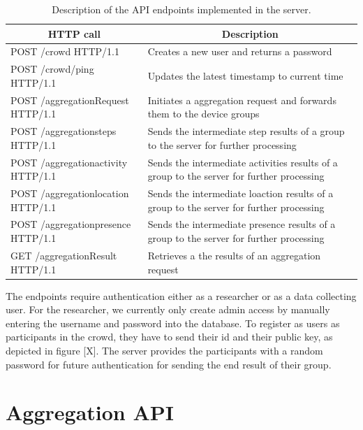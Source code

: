 \begin{table}[htbp]
\centering
  \begin{tabularx}{0.92\textwidth}{|l|X|}                                                                             \hline
		\multicolumn{1}{|c|}{\textbf{HTTP call}} & \multicolumn{1}{c|}{\textbf{Description}} \\ [0.5ex] 
		\hline
		POST /crowd HTTP/1.1 & Creates a new user and returns a password \\
		\hline
		POST /crowd/ping HTTP/1.1 & Updates the latest timestamp to current time \\
		\hline
		POST /aggregationRequest HTTP/1.1 & Initiates a aggregation request and forwards them to the device groups \\ 
		\hline
		POST /aggregationsteps HTTP/1.1 & Sends the intermediate step results of a group to the server for further processing  \\ 
		\hline
		POST /aggregationactivity HTTP/1.1 & Sends the intermediate activities results of a group to the server for further processing  \\ 
		\hline
		POST /aggregationlocation HTTP/1.1 & Sends the intermediate loaction results of a group to the server for further processing  \\ 
		\hline
		POST /aggregationpresence HTTP/1.1 & Sends the intermediate presence results of a group to the server for further processing  \\ 
		\hline
		GET /aggregationResult HTTP/1.1 & Retrieves a the results of an aggregation request \\ 
		\hline
  \end{tabularx}
  \caption{Description of the API endpoints implemented in the server.}
  \label{tab:rest}
\end{table}

The endpoints require authentication either as a researcher or as a data collecting user. For the researcher, we currently only create admin access by manually entering the username and password into the database. To register as users as participants in the crowd, they have to send their id and their public key, as depicted in figure [X]. The server provides the participants with a random password for future authentication for sending the end result of their group.

\section{Aggregation API}

